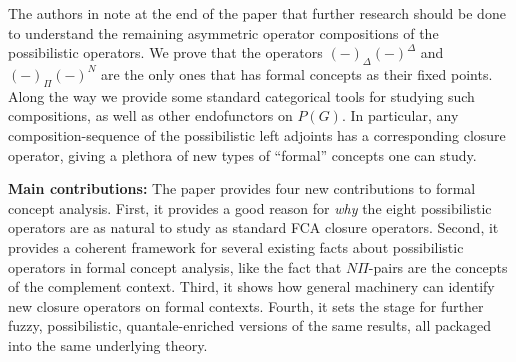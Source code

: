 The authors in \cite{yakub-djouadi-dubois-prade_2016} note at the end of the paper that further research should be done to understand the remaining asymmetric operator compositions of the possibilistic operators. We prove that the operators $(-)_\Delta (-)^\Delta$ and $(-)_\Pi (-)^N$ are the only ones that has formal concepts as their fixed points. Along the way we provide some standard categorical tools for studying such compositions, as well as other endofunctors on $P(G)$. In particular, any composition-sequence of the possibilistic left adjoints has a corresponding closure operator, giving a plethora of new types of ``formal'' concepts one can study.  

\textbf{Main contributions:} The paper provides four new contributions to formal concept analysis. First, it provides a good reason for \emph{why} the eight possibilistic operators are as natural to study as standard FCA closure operators. Second, it provides a coherent framework for several existing facts about possibilistic operators in formal concept analysis, like the fact that $N\Pi$-pairs are the concepts of the complement context. Third, it shows how general machinery can identify new closure operators on formal contexts. Fourth, it sets the stage for further fuzzy, possibilistic, quantale-enriched versions of the same results, all packaged into the same underlying theory.  